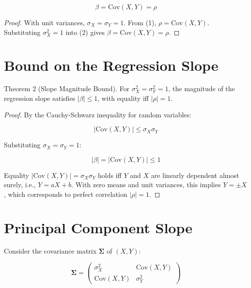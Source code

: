 \documentclass{article}
\begin{document}
\begin{equation}
    \boxed{\beta = \text{Cov}(X,Y) = \rho}
\end{equation}

\begin{proof}
With unit variances, $\sigma_X = \sigma_Y = 1$. From (1), $\rho = \text{Cov}(X,Y)$. Substituting $\sigma_X^2 = 1$ into (2) gives $\beta = \text{Cov}(X,Y) = \rho$.
\end{proof}

\section*{Bound on the Regression Slope}

Theorem 2 (Slope Magnitude Bound). For $\sigma_X^2 = \sigma_Y^2 = 1$, the magnitude of the regression slope satisfies $|\beta| \leq 1$, with equality iff $|\rho| = 1$.

\begin{proof}
By the Cauchy-Schwarz inequality for random variables:

\begin{equation}
    |\text{Cov}(X,Y)| \leq \sigma_X \sigma_Y
\end{equation}

Substituting $\sigma_X = \sigma_Y = 1$:

\begin{equation}
    |\beta| = |\text{Cov}(X,Y)| \leq 1
\end{equation}

Equality $|\text{Cov}(X,Y)| = \sigma_X \sigma_Y$ holds iff $Y$ and $X$ are linearly dependent almost surely, i.e., $Y = aX + b$. With zero means and unit variances, this implies $Y = \pm X$, which corresponds to perfect correlation $|\rho| = 1$.
\end{proof}

\section*{Principal Component Slope}

Consider the covariance matrix $\mathbf{\Sigma}$ of $(X,Y)$:

\begin{equation}
    \mathbf{\Sigma} = \begin{pmatrix} \sigma_X^2 & \text{Cov}(X,Y) \\ \text{Cov}(X,Y) & \sigma_Y^2 \end{pmatrix}
\end{equation}
\end{document}
